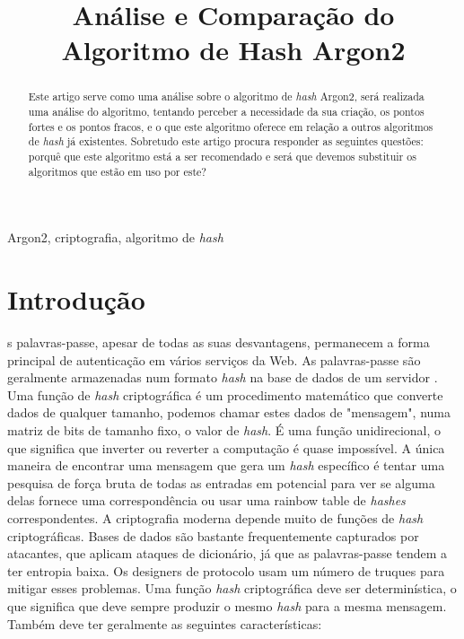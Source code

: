 \documentclass[conference]{IEEEtran}
\begin{document}
\title{Análise e Comparação do Algoritmo de Hash Argon2\\
}

\author{
}

\maketitle

\begin{abstract}
Este artigo serve como uma análise sobre o algoritmo de \textit{hash} Argon2, será realizada 
uma análise do algoritmo, tentando perceber a necessidade da sua criação, os pontos 
fortes e os pontos fracos, e o que este algoritmo oferece em relação a outros 
algoritmos de \textit{hash} já existentes. Sobretudo este artigo procura responder as 
seguintes questões: porquê que este algoritmo está a ser recomendado e será que 
devemos substituir os algoritmos que estão em uso por este?
\end{abstract}

\begin{IEEEkeywords}
Argon2, criptografia, algoritmo de \textit{hash}
\end{IEEEkeywords}

\section{Introdução}
s palavras-passe, apesar de todas as suas desvantagens, permanecem a forma 
principal de autenticação em vários serviços da Web. 
As palavras-passe são geralmente armazenadas num formato \textit{hash} na base de dados 
de um servidor \cite{argon2spec}. Uma função de \textit{hash} criptográfica é um procedimento matemático que 
converte dados de qualquer tamanho, podemos chamar estes dados de "mensagem", numa 
matriz de bits de tamanho fixo, o valor de \textit{hash}. É uma função unidirecional, o que 
significa que inverter ou reverter a computação é quase impossível. A única maneira 
de encontrar uma mensagem que gera um \textit{hash} específico é tentar uma pesquisa de força 
bruta de todas as entradas em potencial para ver se alguma delas fornece uma correspondência 
ou usar uma rainbow table de \textit{hashes} correspondentes. A criptografia moderna depende 
muito de funções de \textit{hash} criptográficas.
Bases de dados são bastante frequentemente capturados 
por atacantes, que aplicam ataques de dicionário, já que as palavras-passe 
tendem a ter entropia baixa. Os designers de protocolo usam um número de 
truques para mitigar esses problemas. 
Uma função \textit{hash} criptográfica deve ser determinística, o que significa que deve sempre produzir o 
mesmo \textit{hash} para a mesma mensagem. Também deve ter geralmente as seguintes características: 
\end{document}
